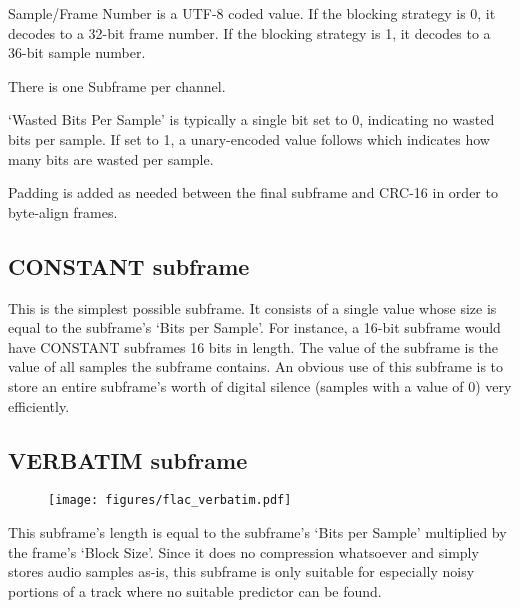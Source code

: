\noindent
Sample/Frame Number is a UTF-8 coded value.
If the blocking strategy is 0, it decodes to a 32-bit frame number.
If the blocking strategy is 1, it decodes to a 36-bit sample number.

There is one Subframe per channel.

`Wasted Bits Per Sample' is typically a single bit set to 0, indicating
no wasted bits per sample.  If set to 1, a unary-encoded value
follows which indicates how many bits are wasted per sample.

Padding is added as needed between the final subframe and CRC-16
in order to byte-align frames.

\pagebreak

\subsection{CONSTANT subframe}

This is the simplest possible subframe.
It consists of a single value whose size is equal to the subframe's
`Bits per Sample'.
For instance, a 16-bit subframe would have CONSTANT subframes
16 bits in length.
The value of the subframe is the value of all samples the subframe
contains.
An obvious use of this subframe is to store an entire subframe's worth
of digital silence (samples with a value of 0) very efficiently.

\subsection{VERBATIM subframe}

\begin{figure}[h]
\texttt{[image: figures/flac\_verbatim.pdf]}
\end{figure}
\noindent
This subframe's length is equal to the subframe's `Bits per Sample'
multiplied by the frame's `Block Size'.
Since it does no compression whatsoever and simply stores
audio samples as-is, this subframe is only suitable for especially
noisy portions of a track where no suitable predictor can be found.

